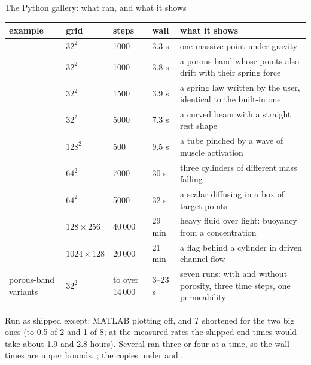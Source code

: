 \documentclass[aspectratio=169,11pt]{beamer}
\begin{document}
\begin{frame}{The Python gallery: what ran, and what it shows}
\label{fr:runs}
\tiny
\begin{tabular}{@{}L{0.24\textwidth}L{0.11\textwidth}L{0.09\textwidth}L{0.08\textwidth}L{0.36\textwidth}@{}}
\toprule
example & grid & steps & wall & what it shows \\
\midrule
{} & $32^2$ & 1000 & 3.3 s & one massive point under gravity \\
\allowbreak{} & $32^2$ & 1000 & 3.8 s & a porous band whose points also drift with their spring force \\
\allowbreak{} & $32^2$ & 1500 & 3.9 s & a spring law written by the user, identical to the built-in one \\
\allowbreak{} & $32^2$ & 5000 & 7.3 s & a curved beam with a straight rest shape \\
\allowbreak{} & $128^2$ & 500 & 9.5 s & a tube pinched by a wave of muscle activation \\
\allowbreak{} & $64^2$ & 7000 & 30 s & three cylinders of different mass falling \\
\allowbreak{} & $64^2$ & 5000 & 32 s & a scalar diffusing in a box of target points \\
\allowbreak{} & $128 \times 256$ & 40\,000 & 29 min & heavy fluid over light: buoyancy from a concentration \\
 & $1024 \times 128$ & 20\,000 & 21 min & a flag behind a cylinder in driven channel flow \\
porous-band variants & $32^2$ & to over 14\,000 & 3--23 s & seven runs: with and without porosity, three time steps, one permeability \\
\bottomrule
\end{tabular}

\vspace{1mm}
\footnotesize Run as shipped except: MATLAB plotting off, and $T$ shortened for the two big ones (to 0.5 of 2 and 1 of 8; at the measured rates the shipped end times would take about 1.9 and 2.8 hours). Several ran three or four at a time, so the wall times are upper bounds. ; the copies under  and .
\end{frame}
\end{document}
